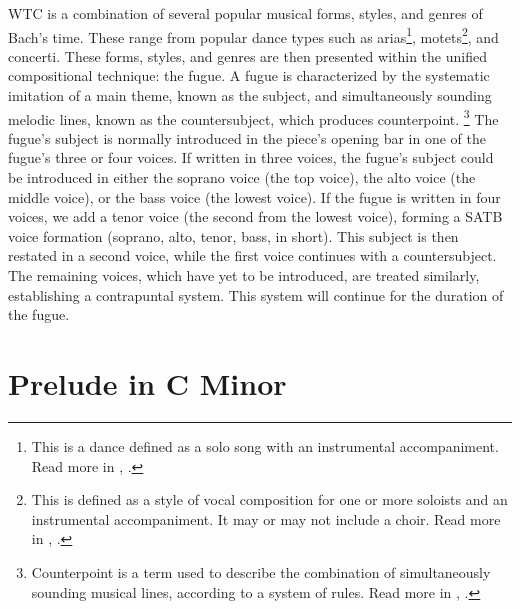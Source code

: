 WTC is a combination of several popular musical forms, styles, and genres of Bach's time. These range from popular dance types such as arias\footnote{This is a dance defined as a solo song with an instrumental accompaniment. Read more in \citeauthor{Marshall_Emery_2019}, \citeyear{Marshall_Emery_2019}.}, motets\footnote{This is defined as a style of vocal composition for one or more soloists and an instrumental accompaniment. It may or may not include a choir. Read more in \citeauthor{Marshall_Emery_2019}, \citeyear{Marshall_Emery_2019}.}, and concerti. These forms, styles, and genres are then presented within the unified compositional technique: the fugue. A fugue is characterized by the systematic imitation of a main theme, known as the subject, and simultaneously sounding melodic lines, known as the countersubject, which produces counterpoint. \autocite{Marshall_Emery_2019}\footnote{Counterpoint is a term used to describe the combination of simultaneously sounding musical lines, according to a system of rules. Read more in \citeauthor{Sachs_Dahlhaus_2001}, \citeyear{Sachs_Dahlhaus_2001}.} The fugue's subject is normally introduced in the piece's opening bar in one of the fugue's three or four voices. If written in three voices, the fugue's subject could be introduced in either the soprano voice (the top voice), the alto voice (the middle voice), or the bass voice (the lowest voice). If the fugue is written in four voices, we add a tenor voice (the second from the lowest voice), forming a SATB voice formation (soprano, alto, tenor, bass, in short). This subject is then restated in a second voice, while the first voice continues with a countersubject. The remaining voices, which have yet to be introduced, are treated similarly, establishing a contrapuntal system. This system will continue for the duration of the fugue.

\section{Prelude in C Minor}

